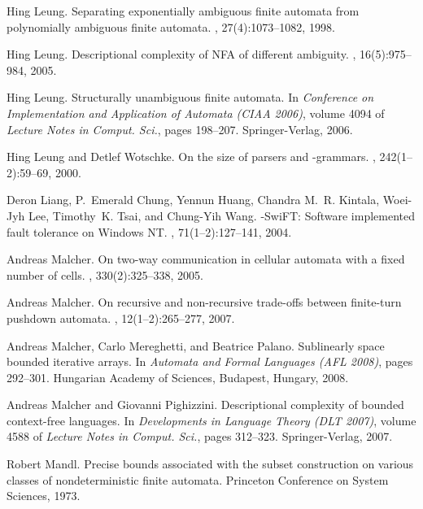 \documentclass[copyright]{eptcs}
\begin{document}
\begin{thebibliography}{10}
Hing Leung.
\newblock Separating exponentially ambiguous finite automata from polynomially
  ambiguous finite automata.
, 27(4):1073--1082, 1998.

Hing Leung.
\newblock Descriptional complexity of {NFA} of different ambiguity.
, 16(5):975--984, 2005.

Hing Leung.
\newblock Structurally unambiguous finite automata.
\newblock In {\em Conference on Implementation and Application of Automata
  (CIAA 2006)}, volume 4094 of {\em Lecture Notes in Comput. Sci.}, pages
  198--207. Springer-Verlag, 2006.

Hing Leung and Detlef Wotschke.
\newblock On the size of parsers and {}-grammars.
, 242(1--2):59--69, 2000.

Deron Liang, P.~Emerald Chung, Yennun Huang, Chandra M.~R. Kintala, Woei-Jyh
  Lee, Timothy~K. Tsai, and Chung-Yih Wang.
-{SwiFT}: Software implemented fault tolerance on {W}indows {NT}.
, 71(1--2):127--141, 2004.

Andreas Malcher.
\newblock On two-way communication in cellular automata with a fixed number of
  cells.
, 330(2):325--338, 2005.

Andreas Malcher.
\newblock On recursive and non-recursive trade-offs between finite-turn
  pushdown automata.
, 12(1--2):265--277, 2007.

Andreas Malcher, Carlo Mereghetti, and Beatrice Palano.
\newblock Sublinearly space bounded iterative arrays.
\newblock In {\em Automata and Formal Languages (AFL 2008)}, pages 292--301.
  Hungarian Academy of Sciences, Budapest, Hungary, 2008.

Andreas Malcher and Giovanni Pighizzini.
\newblock Descriptional complexity of bounded context-free languages.
\newblock In {\em Developments in Language Theory (DLT 2007)}, volume 4588 of
  {\em Lecture Notes in Comput. Sci.}, pages 312--323. Springer-Verlag, 2007.

Robert Mandl.
\newblock Precise bounds associated with the subset construction on various
  classes of nondeterministic finite automata.
\newblock Princeton Conference on System Sciences, 1973.


\end{thebibliography}
\end{document}
